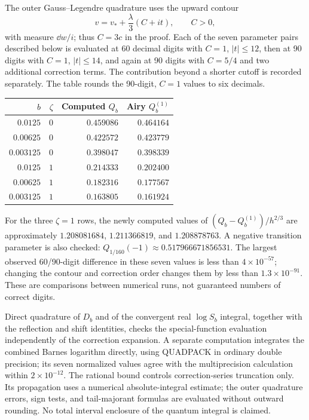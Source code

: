The outer Gauss--Legendre quadrature uses the upward contour
\[
 v=v_*+\frac{\lambda}{3}(C+it),\qquad C>0,
\]
with measure $\dd w/i$; thus $C=3c$ in the proof.
Each of the seven parameter pairs described below is evaluated
at 60 decimal digits with $C=1$, $|t|\le12$, then at 90 digits
with $C=1$, $|t|\le14$, and again at 90 digits with $C=5/4$
and two additional correction terms. The contribution beyond
a shorter cutoff is recorded separately. The table rounds the
90-digit, $C=1$ values to six decimals.
\begin{center}
\begin{tabular}{rrrr}
\toprule
$b$&$\zeta$&Computed $Q_b$&Airy $Q_b^{(1)}$\\
\midrule
$0.0125$&$0$&$0.459086$&$0.464164$\\
$0.00625$&$0$&$0.422572$&$0.423779$\\
$0.003125$&$0$&$0.398047$&$0.398339$\\
$0.0125$&$1$&$0.214333$&$0.202400$\\
$0.00625$&$1$&$0.182316$&$0.177567$\\
$0.003125$&$1$&$0.163805$&$0.161924$\\
\bottomrule
\end{tabular}
\end{center}
For the three $\zeta=1$ rows, the newly computed values of
$(Q_b-Q_b^{(1)})/h^{2/3}$ are approximately
$1.208081684$, $1.211366819$, and $1.208878763$.
A negative transition parameter is also checked:
$Q_{1/160}(-1)\approx0.517966671856531$.
The largest observed 60/90-digit difference in these seven
values is less than $4\times10^{-57}$; changing the contour
and correction order changes them by less than
$1.3\times10^{-91}$. These are comparisons between numerical
runs, not guaranteed numbers of correct digits.

Direct quadrature of $D_b$ and of the convergent real
$\log S_b$ integral, together with the reflection and shift
identities, checks the special-function evaluation independently
of the correction expansion. A separate computation integrates
the combined Barnes logarithm directly, using QUADPACK in
ordinary double precision; its seven normalized values agree
with the multiprecision calculation within $2\times10^{-12}$.
The rational bound controls correction-series truncation only.
Its propagation uses a numerical absolute-integral estimate;
the outer quadrature errors, sign tests, and tail-majorant
formulas are evaluated without outward rounding. No total
interval enclosure of the quantum integral is claimed.

